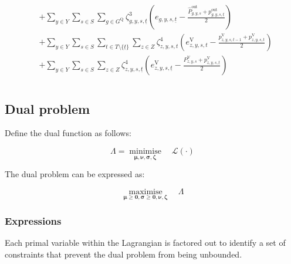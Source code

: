 \documentclass{article}
\newcommand{\sStorage}{G^{\mathrm{Q}}}
\newcommand{\sYears}{Y}
\newcommand{\sScenarios}{S}
\newcommand{\sIntervals}{T}
\newcommand{\sZones}{Z}
\newcommand{\iGenerator}{g}
\newcommand{\iYear}{y}
\newcommand{\iScenario}{s}
\newcommand{\iInterval}{t}
\newcommand{\iIntervalStart}{\underline{\iInterval}}
\newcommand{\iZone}{z}
\newcommand{\cPowerOutInitial}[1][\iGenerator,\iYear,\iScenario]{\hat{P}_{#1}^{\mathrm{out}}}
\newcommand{\cLostLoadPowerInitial}[1][\iZone,\iYear,\iScenario]{P_{#1}^{\mathrm{V}}}
\newcommand{\vEnergy}[1][\iGenerator,\iYear,\iScenario,\iInterval]{e_{#1}}
\newcommand{\vPowerOut}[1][\iGenerator,\iYear,\iScenario,\iInterval]{p^{\mathrm{out}}_{#1}}
\newcommand{\vLostLoadEnergy}[1][\iZone,\iYear,\iScenario,\iInterval]{e^{\mathrm{V}}_{#1}}
\newcommand{\vLostLoadPower}[1][\iZone,\iYear,\iScenario,\iInterval]{p^{\mathrm{V}}_{#1}}
\newcommand{\dStorageEnergyOutput}[1][\iGenerator,\iYear,\iScenario,\iInterval]{\zeta_{#1}^{3}}
\newcommand{\dLostLoadEnergy}[1][\iZone,\iYear,\iScenario,\iInterval]{\zeta_{#1}^{4}}
\DeclareMathOperator*{\minimise}{minimise}
\DeclareMathOperator*{\maximise}{maximise}
\begin{document}
\begin{align}
\begin{split}
		& + \sum\limits_{\iYear \in \sYears}\sum\limits_{\iScenario \in \sScenarios} \sum\limits_{\iGenerator \in \sStorage} \dStorageEnergyOutput[\iGenerator,\iYear,\iScenario,\iIntervalStart] \left(\vEnergy[\iGenerator,\iYear,\iScenario,\iIntervalStart] - \frac{\cPowerOutInitial + \vPowerOut[\iGenerator,\iYear,\iScenario,\iIntervalStart]}{2} \right)\\
		& + \sum\limits_{\iYear \in \sYears}\sum\limits_{\iScenario \in \sScenarios}\sum\limits_{\iInterval \in \sIntervals \setminus \{\iIntervalStart\}} \sum\limits_{\iZone \in \sZones} \dLostLoadEnergy \left(\vLostLoadEnergy - \frac{\vLostLoadPower[\iZone, \iYear,\iScenario,\iInterval-1] + \vLostLoadPower}{2} \right)\\
		& + \sum\limits_{\iYear \in \sYears}\sum\limits_{\iScenario \in \sScenarios} \sum\limits_{\iZone \in \sZones} \dLostLoadEnergy[\iZone,\iYear,\iScenario,\iIntervalStart] \left(\vLostLoadEnergy[\iZone,\iYear,\iScenario,\iIntervalStart] - \frac{\cLostLoadPowerInitial + \vLostLoadPower[\iZone,\iYear,\iScenario,\iIntervalStart]}{2} \right)\\
	\end{split}
\end{align}

\subsection{Dual problem}
Define the dual function as follows:

\begin{equation}
	\Lambda = \minimise\limits_{\bm{\mu}, \bm{\nu}, \bm{\sigma}, \bm{\zeta}} \quad \mathcal{L}(\cdot)
\end{equation}

The dual problem can be expressed as:

\begin{equation}
	\maximise\limits_{\bm{\mu}\geq \bm{0}, \bm{\sigma}\geq \bm{0}, \bm{\nu}, \bm{\zeta}} \quad \Lambda
\end{equation}

\subsubsection{Expressions}
Each primal variable within the Lagrangian is factored out to identify a set of constraints that prevent the dual problem from being unbounded.

\newcommand{\sumIntervals}{\sum\limits_{\iYear \in \sYears}\sum\limits_{\iScenario \in \sScenarios} \sum\limits_{\iInterval \in \sIntervals}}
\end{document}
